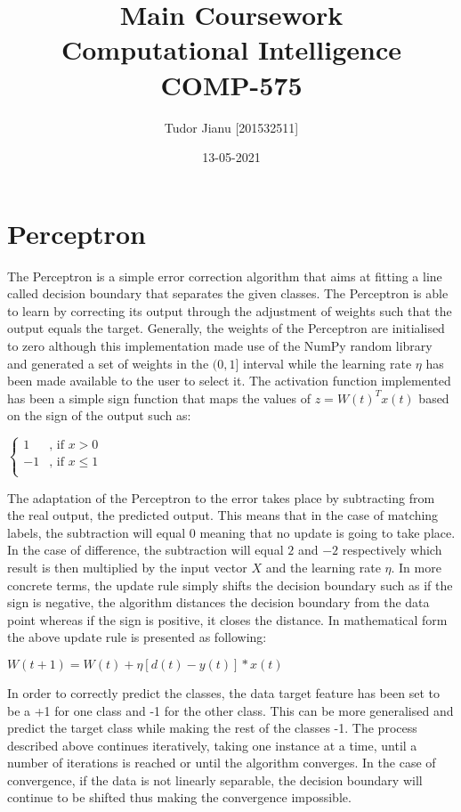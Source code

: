 \documentclass{report}
\title{Main Coursework \\ Computational Intelligence \\ COMP-575}
\author{Tudor Jianu [201532511]}
\date{13-05-2021}
\begin{document}
\lstset{language=Python} 

\maketitle

\chapter{Perceptron}

   The Perceptron is a simple error correction algorithm that aims at fitting a line called decision boundary that separates the given classes. The Perceptron is able to learn by correcting its output through the adjustment of weights such that the output equals the target. 
Generally, the weights of the Perceptron are initialised to zero although this implementation made use of the NumPy random library and generated a set of weights in the $(0,1]$ interval while the learning rate $\eta$ has been made available to the user to select it. The activation function implemented has been a simple sign function that maps the values of $z=W(t)^{T} x(t)$ based on the sign of the output such as:

\begin{center}
$\begin{cases}
    1 & \text{, if } x > 0\\
    -1 & \text{, if } x \leq 1\\
\end{cases}$
\end{center}

The adaptation of the Perceptron to the error takes place by subtracting from the real output, the predicted output. This means that in the case of matching labels, the subtraction will equal $0$ meaning that no update is going to take place. In the case of difference, the subtraction will equal $2$ and $-2$ respectively which result is then multiplied by the input vector $X$ and the learning rate $\eta$. In more concrete terms, the update rule simply shifts the decision boundary such as if the sign is negative, the algorithm distances the decision boundary from the data point whereas if the sign is positive, it closes the distance. In mathematical form the above update rule is presented as following:

\begin{center}
$ W(t+1) = W(t) + \eta [d(t) - y(t)] * x(t)
$
\end{center}

In order to correctly predict the classes, the data target feature has been set to be a +1 for one class and -1 for the other class. This can be more generalised and predict the target class while making the rest of the classes -1. 
The process described above continues iteratively, taking one instance at a time, until a number of iterations is reached or until the algorithm converges. In the case of convergence, if the data is not linearly separable, the decision boundary will continue to be shifted thus making the convergence impossible.
\end{document}
